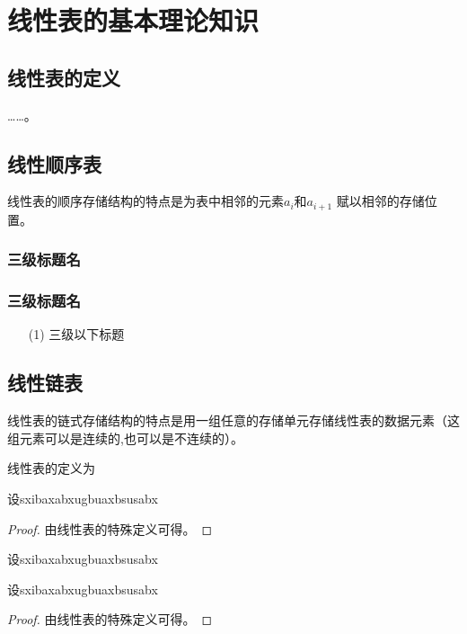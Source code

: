 

\section{线性表的基本理论知识}
\subsection{线性表的定义}

……。
\subsection{线性顺序表}
线性表的顺序存储结构的特点是为表中相邻的元素$a_i$和$a_{i+1}$ 赋以相邻的存储位置。
\subsubsection{三级标题名}
\subsubsection{三级标题名}
\begin{itemize}
        \item [(1)] 三级以下标题
\end{itemize}




\subsection{线性链表}

线性表的链式存储结构的特点是用一组任意的存储单元存储线性表的数据元素（这组元素可以是连续的,也可以是不连续的）。


\begin{definition}
线性表的定义为
\end{definition}


\begin{theorem}
设sxibaxabxugbuaxbsusabx
\begin{proof}
由线性表的特殊定义可得。
\end{proof}
\end{theorem}
设sxibaxabxugbuaxbsusabx
\begin{lemma}
设sxibaxabxugbuaxbsusabx
\begin{proof}
由线性表的特殊定义可得。
\end{proof}
\end{lemma}

